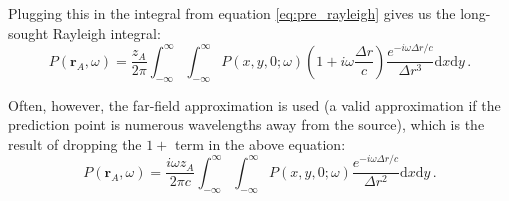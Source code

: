 Plugging this in the integral from equation \ref{eq:pre_rayleigh} gives us the long-sought Rayleigh integral:
\begin{equation}
    P(\mathbf r_A, \omega) = \frac{z_A}{2\pi} \int_{-\infty}^\infty \int_{-\infty}^\infty P(x, y, 0; \omega) \left( 1+i\omega \frac{\Delta r}{c} \right)\frac{e^{-i\omega \Delta r/c}}{\Delta r^3} \mathrm dx \mathrm d y \,.\label{eq:rayleigh}
\end{equation}

Often, however, the far-field approximation is used (a valid approximation if the prediction point is numerous wavelengths away from the source), which is the result of dropping the $1+$ term in the above equation:
\begin{equation}
    P(\mathbf r_A, \omega) = \frac{i \omega z_A}{2\pi c} \int_{-\infty}^\infty \int_{-\infty}^\infty P(x, y, 0; \omega) \frac{e^{-i\omega \Delta r/c}}{\Delta r^2}  \mathrm dx \mathrm d y \,.\nonumber
\end{equation}

